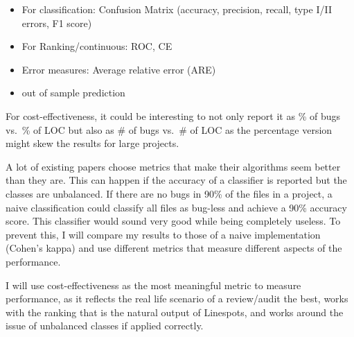\begin{itemize}
    \item For classification: Confusion Matrix (accuracy, precision, recall, type I/II errors, F1 score)
    \item For Ranking/continuous: ROC, CE
    \item Error measures: Average relative error (ARE)
    \item out of sample prediction
\end{itemize}
\cite{6035727}

For cost-effectiveness, it could be interesting to not only report it as \% of bugs vs.\ \% of LOC but also as \# of bugs vs.\ \# of LOC as the percentage version might skew the results for large projects.

A lot of existing papers choose metrics that make their algorithms seem better than they are. This can happen if the accuracy of a classifier is reported but the classes are unbalanced. If there are no bugs in 90\% of the files in a project, a naive classification could classify all files as bug-less and achieve a 90\% accuracy score. This classifier would sound very good while being completely useless.
To prevent this, I will compare my results to those of a naive implementation (Cohen's kappa) and use different metrics that measure different aspects of the performance. %

I will use cost-effectiveness as the most meaningful metric to measure performance, as it reflects the real life scenario of a review\slash audit the best, works with the ranking that is the natural output of Linespots, and works around the issue of unbalanced classes if applied correctly.